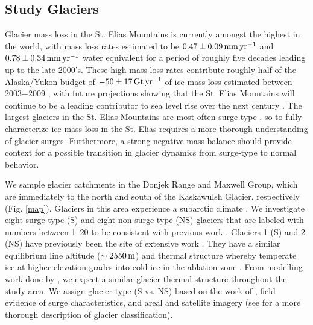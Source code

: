 \documentclass[draft,linenumbers]{agujournal}
\begin{document}
\subsection{Study Glaciers}

Glacier mass loss in the St. Elias Mountains is currently amongst the highest in the world, with mass loss rates estimated to be $\rm 0.47\pm0.09\,mm\,yr^{-1}$ \citep{Etienne2010} and $\rm0.78\pm0.34\,mm\,yr^{-1}$ \citep{Barrand2010} water equivalent for a period of roughly five decades leading up to the late 2000's. These high mass loss rates contribute roughly half of the Alaska/Yukon budget of $\rm -50\pm17\,Gt\,yr^{-1}$ of ice mass loss estimated between 2003$-$2009 \citep{Gardner2013}, with future projections showing that the St. Elias Mountains will continue to be a leading contributor to sea level rise over the next century \citep{Radic2011}. The largest glaciers in the St. Elias Mountains are most often surge-type \citep{Clarke1986}, so to fully characterize ice mass loss in the St. Elias requires a more thorough understanding of glacier-surges. Furthermore, a strong negative mass balance should provide context for a possible transition in glacier dynamics from surge-type to normal behavior. 

We sample glacier catchments in the Donjek Range and Maxwell Group, which are immediately to the north and south of the Kaskawulsh Glacier, respectively (Fig. \ref{map}). Glaciers in this area experience a subarctic climate \citep{MacDougall2011}. We investigate eight surge-type (S) and eight non-surge type (NS) glaciers that are labeled with numbers between 1--20 to be consistent with previous work \citep{Crompton2016}. Glaciers 1 (S) and 2 (NS) have previously been the site of extensive work \citep[e.g.][]{MacDougall2011,Wilson2013}. They have a similar equilibrium line altitude ($\rm \sim 2550\,m$) and thermal structure whereby temperate ice at higher elevation grades into cold ice in the ablation zone \citep{Wilson2013}. From modelling work done by \citet{Wilson2013a}, we expect a similar glacier thermal structure throughout the study area. We assign glacier-type (S vs. NS) based on the work of \cite{Clarke1986}, field evidence of surge characteristics, and areal and satellite imagery (see \cite{Crompton2016} for a more thorough description of glacier classification). 


\end{document}
